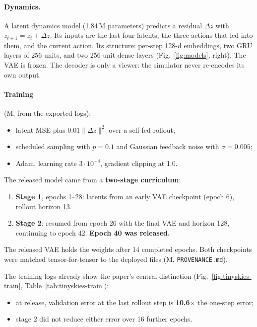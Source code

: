 \documentclass[11pt]{article}
\begin{document}
\paragraph{Dynamics.} A latent dynamics model (1.84\,M parameters) predicts a residual $\Delta z$ with $z_{t+1}=z_t+\Delta z$. Its inputs are the last four latents, the three actions that led into them, and the current action. Its structure: per-step 128-d embeddings, two GRU layers of 256 units, and two 256-unit dense layers (Fig.~\ref{fig:models}, right). The VAE is frozen. The decoder is only a viewer: the simulator never re-encodes its own output.

\paragraph{Training} (M, from the exported logs):
\begin{itemize}
  \item latent MSE plus $0.01\lVert\Delta z\rVert^2$ over a self-fed rollout;
  \item scheduled sampling with $p = 0.1$ and Gaussian feedback noise with $\sigma = 0.005$;
  \item Adam, learning rate $3\cdot10^{-4}$, gradient clipping at 1.0.
\end{itemize}

The released model came from a \textbf{two-stage curriculum}:
\begin{enumerate}
  \item \textbf{Stage 1}, epochs 1--28: latents from an early VAE checkpoint (epoch 6), rollout horizon 13.
  \item \textbf{Stage 2}: resumed from epoch 26 with the final VAE and horizon 128, continuing to epoch 42. \textbf{Epoch 40 was released.}
\end{enumerate}
The released VAE holds the weights after 14 completed epochs. Both checkpoints were matched tensor-for-tensor to the deployed files (M, \texttt{PROVENANCE.md}).

The training logs already show the paper's central distinction (Fig.~\ref{fig:tinyskies-train}, Table~\ref{tab:tinyskies-train}):
\begin{itemize}
  \item at release, validation error at the last rollout step is \textbf{10.6$\times$} the one-step error;
  \item stage 2 did not reduce either error over 16 further epochs.
\end{itemize}
\end{document}
